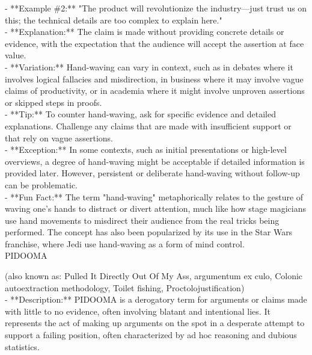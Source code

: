 \documentclass[a4paper,12pt,single,pdftex]{scrbook}
\begin{document}
    
      - **Example \#2:** "The product will revolutionize the industry—just trust us on this; the technical details are too complex to explain here."
    \\

    
      - **Explanation:** The claim is made without providing concrete details or evidence, with the expectation that the audience will accept the assertion at face value.
    \\

    
      - **Variation:** Hand-waving can vary in context, such as in debates where it involves logical fallacies and misdirection, in business where it may involve vague claims of productivity, or in academia where it might involve unproven assertions or skipped steps in proofs.
    \\

    
      - **Tip:** To counter hand-waving, ask for specific evidence and detailed explanations. Challenge any claims that are made with insufficient support or that rely on vague assertions.
    \\

    
      - **Exception:** In some contexts, such as initial presentations or high-level overviews, a degree of hand-waving might be acceptable if detailed information is provided later. However, persistent or deliberate hand-waving without follow-up can be problematic.
    \\

    
      - **Fun Fact:** The term "hand-waving" metaphorically relates to the gesture of waving one’s hands to distract or divert attention, much like how stage magicians use hand movements to misdirect their audience from the real tricks being performed. The concept has also been popularized by its use in the Star Wars franchise, where Jedi use hand-waving as a form of mind control.
    \\

  

PIDOOMA
    
      (also known as:  Pulled It Directly Out Of My Ass, argumentum ex culo, Colonic autoextraction methodology, Toilet fishing, Proctolojustification)
    \\

  
    
      - **Description:** PIDOOMA is a derogatory term for arguments or claims made with little to no evidence, often involving blatant and intentional lies. It represents the act of making up arguments on the spot in a desperate attempt to support a failing position, often characterized by ad hoc reasoning and dubious statistics.
    \\
\end{document}
